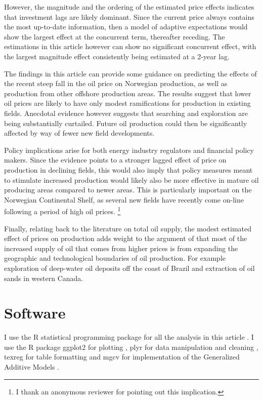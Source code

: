 \documentclass[12pt]{article}
\begin{document}
However, the magnitude and the ordering of the estimated price effects indicates that investment lags are likely dominant. Since the current price always contains the most up-to-date information, then a model of adaptive expectations would show the largest effect at the concurrent term, thereafter receding. The estimations in this article however can show no significant concurrent effect, with the largest magnitude effect consistently being estimated at a 2-year lag.

The findings in this article can provide some guidance on predicting the effects of the recent steep fall in the oil price on Norwegian production, as well as production from other offshore production areas. The results suggest that lower oil prices are likely to have only modest ramifications for production in existing fields.  Anecdotal evidence however suggests that searching and exploration are being substantially curtailed. Future oil production could then be significantly affected by way of fewer new field developments.

Policy implications arise for both energy industry regulators and financial policy makers. Since the evidence points to a stronger lagged effect of price on production in declining fields, this would also imply that policy measures meant to stimulate increased production would likely also be more effective in mature oil producing areas compared to newer areas. This is particularly important on the Norwegian Continental Shelf, as several new fields have recently come on-line following a period of high oil prices. \footnote{I thank an anonymous reviewer for pointing out this implication.}

Finally, relating back to the literature on total oil supply, the modest estimated effect of prices on production adds weight to the argument of \citet{hamilton_oil_2012} that most of the increased supply of oil that comes from higher prices is from expanding the geographic and technological boundaries of oil production.  For example exploration of deep-water oil deposits off the coast of Brazil and extraction of oil sands in western Canada.

\FloatBarrier
\section{Software}
I use the R statistical programming package for all the analysis in this article \citep{r_core_team_r:_2013}.  I use the R package ggplot2 for plotting \citep{wickham_ggplot2:_2009}, plyr for data manipulation and cleaning \citep{wickham_split-apply-combine_2011}, texreg for table formatting \citep{leifeld_texreg:_2013} and mgcv for implementation of the Generalized Additive Models \citep{wood_fast_2011}.
\end{document}
